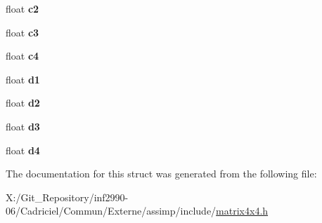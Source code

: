 \begin{DoxyCompactItemize}
\item 
\hypertarget{structai_matrix4x4_a67425f81054b1097c29b73bf317cfeeb}{float {\bfseries c2}}\label{structai_matrix4x4_a67425f81054b1097c29b73bf317cfeeb}

\item 
\hypertarget{structai_matrix4x4_aec8c5745b90139d472eb4e91f1373c1a}{float {\bfseries c3}}\label{structai_matrix4x4_aec8c5745b90139d472eb4e91f1373c1a}

\item 
\hypertarget{structai_matrix4x4_a7e3288f38a4e00d55c02272e1582e462}{float {\bfseries c4}}\label{structai_matrix4x4_a7e3288f38a4e00d55c02272e1582e462}

\item 
\hypertarget{structai_matrix4x4_a13f3800d9106e3be6d0e60b794c5a5ae}{float {\bfseries d1}}\label{structai_matrix4x4_a13f3800d9106e3be6d0e60b794c5a5ae}

\item 
\hypertarget{structai_matrix4x4_a6f17ca1c7e4b9377d0e332f85aab282b}{float {\bfseries d2}}\label{structai_matrix4x4_a6f17ca1c7e4b9377d0e332f85aab282b}

\item 
\hypertarget{structai_matrix4x4_a8d2910f62b34b1e2ace93b55e4db4b92}{float {\bfseries d3}}\label{structai_matrix4x4_a8d2910f62b34b1e2ace93b55e4db4b92}

\item 
\hypertarget{structai_matrix4x4_ac0a65b51f126f7331b4f7dbbd82f3d63}{float {\bfseries d4}}\label{structai_matrix4x4_ac0a65b51f126f7331b4f7dbbd82f3d63}

\end{DoxyCompactItemize}


The documentation for this struct was generated from the following file\-:\begin{DoxyCompactItemize}
\item 
X\-:/\-Git\-\_\-\-Repository/inf2990-\/06/\-Cadriciel/\-Commun/\-Externe/assimp/include/\hyperlink{matrix4x4_8h}{matrix4x4.\-h}\end{DoxyCompactItemize}
